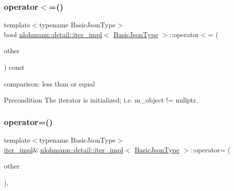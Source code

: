 \subsubsection{\texorpdfstring{operator$<$=()}{operator<=()}}
{\footnotesize\ttfamily template$<$typename Basic\+Json\+Type$>$ \\
bool \hyperlink{classnlohmann_1_1detail_1_1iter__impl}{nlohmann\+::detail\+::iter\+\_\+impl}$<$ \hyperlink{classnlohmann_1_1detail_1_1iter__impl_abf18f18793f84b0222aebb5a2a87da7a}{Basic\+Json\+Type} $>$\+::operator$<$= (\begin{DoxyParamCaption}\item[{const \hyperlink{classnlohmann_1_1detail_1_1iter__impl}{iter\+\_\+impl}$<$ \hyperlink{classnlohmann_1_1detail_1_1iter__impl_abf18f18793f84b0222aebb5a2a87da7a}{Basic\+Json\+Type} $>$ \&}]{other }\end{DoxyParamCaption}) const\hspace{0.3cm}{\ttfamily [inline]}}



comparison\+: less than or equal 

\begin{DoxyPrecond}{Precondition}
The iterator is initialized; i.\+e. {\ttfamily m\+\_\+object != nullptr}. 
\end{DoxyPrecond}
\mbox{\label{classnlohmann_1_1detail_1_1iter__impl_a9a5cd7864a8f848ef107d3f5a330f5e7}} 
\subsubsection{\texorpdfstring{operator=()}{operator=()}\hspace{0.1cm}{\footnotesize\ttfamily [1/2]}}
{\footnotesize\ttfamily template$<$typename Basic\+Json\+Type$>$ \\
\hyperlink{classnlohmann_1_1detail_1_1iter__impl}{iter\+\_\+impl}\& \hyperlink{classnlohmann_1_1detail_1_1iter__impl}{nlohmann\+::detail\+::iter\+\_\+impl}$<$ \hyperlink{classnlohmann_1_1detail_1_1iter__impl_abf18f18793f84b0222aebb5a2a87da7a}{Basic\+Json\+Type} $>$\+::operator= (\begin{DoxyParamCaption}\item[{const \hyperlink{classnlohmann_1_1detail_1_1iter__impl}{iter\+\_\+impl}$<$ const \hyperlink{classnlohmann_1_1detail_1_1iter__impl_abf18f18793f84b0222aebb5a2a87da7a}{Basic\+Json\+Type} $>$ \&}]{other }\end{DoxyParamCaption})\hspace{0.3cm}{\ttfamily [inline]}, {\ttfamily [noexcept]}}



